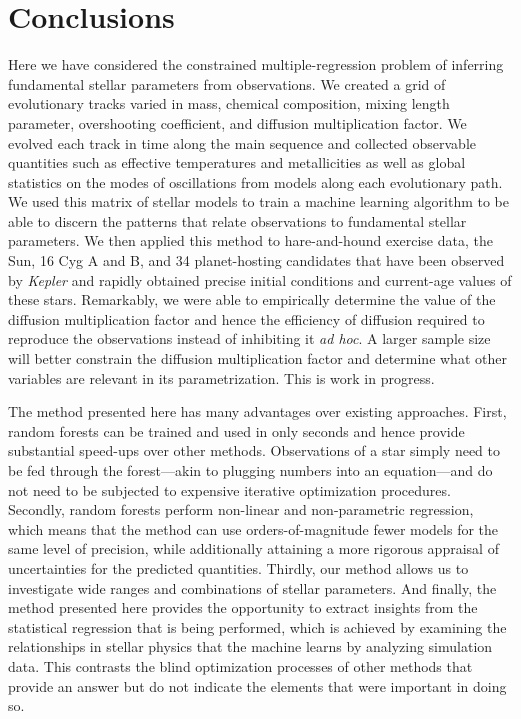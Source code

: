 \documentclass[twocolumn,twocolappendix]{aastex6}
\newif\ifref
\newcommand{\mb}[1]{\ifref\boldmath\textbf{#1}\unboldmath\else #1\fi}
\begin{document}
\section{Conclusions}
Here we have considered the constrained multiple-regression problem of inferring fundamental stellar parameters from observations. We created a grid of evolutionary tracks varied in mass, chemical composition, mixing length parameter, overshooting coefficient, and diffusion \mb{multiplication} factor. We evolved each track in time along the main sequence and collected \mb{observable quantities} such as effective temperatures and metallicities as well as global statistics on the modes of oscillations from models along each evolutionary path. We used this matrix of \mb{stellar models} to train a machine learning algorithm to be able to discern the patterns that relate observations to \mb{fundamental stellar parameters}. We then applied this method to hare-and-hound exercise data, the Sun, 16 Cyg A and B, and 34 planet-hosting candidates that have been observed by \emph{Kepler} and rapidly obtained precise initial conditions and current-age values of these stars. %
Remarkably, we were able to empirically determine the value of the diffusion \mb{multiplication} factor and hence the efficiency of diffusion required to reproduce the observations instead of inhibiting it \emph{ad hoc}. A larger sample size \mb{will} better constrain the diffusion \mb{multiplication} factor and determine what other variables are relevant in its parametrization. \mb{This is work in progress.}

The method presented here has many advantages over existing approaches. First, random forests can be trained and used in only seconds and hence provide substantial speed-ups over other methods. Observations of a star simply need to be fed through the forest---akin to plugging numbers into an equation---and do not need to be subjected to expensive iterative optimization procedures. 
Secondly, random forests perform non-linear and non-parametric regression, which means that the method can use orders-of-magnitude fewer models for the same level of precision, while additionally attaining a more rigorous appraisal of uncertainties for the predicted quantities. 
Thirdly, our method allows us to investigate wide ranges and combinations of stellar parameters. 
And finally, the method presented here provides the opportunity to extract insights from the statistical regression that is being performed, which is achieved by examining the relationships in stellar physics that the machine learns by analyzing simulation data. This contrasts the blind optimization processes of other methods that provide an answer but do not indicate the elements that were important in doing so. 
\end{document}
